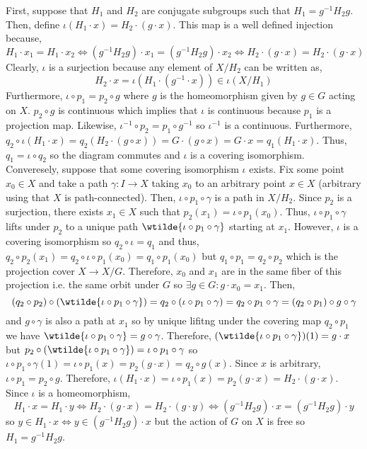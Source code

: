 \documentclass[12pt]{extarticle}
\begin{document}
\begin{enumerate}
First, suppose that $H_1$ and $H_2$ are conjugate subgroups such that $H_1 = g^{-1} H_2 g$. Then, define $\iota(H_1 \cdot x) = H_2 \cdot (g \cdot x)$. This map is a well defined injection because,
\[H_1 \cdot x_1 = H_1 \cdot x_2 \iff (g^{-1} H_2 g) \cdot x_1 = (g^{-1} H_2 g) \cdot x_2 \iff H_2 \cdot (g \cdot x) = H_2 \cdot (g \cdot x)\]
Clearly, $\iota$ is a surjection because any element of $X/H_2$ can be written as, 
\[H_2 \cdot x = \iota(H_1 \cdot (g^{-1} \cdot x)) \in \iota(X/H_1)\]
Furthermore, $\iota \circ p_1 = p_2 \circ g$ where $g$ is the homeomorphism given by $g \in G$ acting on $X$. $p_2 \circ g$ is continuous which implies that $\iota$ is continuous because $p_1$ is a projection map. Likewise, $\iota^{-1} \circ p_2 = p_1 \circ g^{-1}$ so $\iota^{-1}$ is a continuous. Furthermore, $q_2 \circ \iota(H_1 \cdot x) = q_2(H_2 \cdot (g \circ x)) = G \cdot (g \circ x) = G \cdot x = q_1(H_1 \cdot x)$. Thus, $q_1 = \iota \circ q_2$ so the diagram commutes and $\iota$ is a covering isomorphism. \bigskip \\
Converesely, suppose that some covering isomorphism $\iota$ exists. Fix some point $x_0 \in X$ and take a path $\gamma : I \to X$ taking $x_0$ to an arbitrary point $x \in X$ (arbitrary using that $X$ is path-connected). Then, $\iota \circ p_1 \circ \gamma$ is a path in $X/H_2$. Since $p_2$ is a surjection, there exists $x_1 \in X$ such that $p_2(x_1) = \iota \circ p_1(x_0)$. Thus, $\iota \circ p_1 \circ \gamma$ lifts under $p_2$ to a unique path $\wtilde{\iota \circ p_1 \circ \gamma}$ starting at $x_1$. However, $\iota$ is a covering isomorphism so $q_2 \circ \iota = q_1$ and thus, $q_2 \circ p_2(x_1) = q_2 \circ \iota \circ p_1(x_0) = q_1 \circ p_1(x_0)$ but $q_1 \circ p_1 = q_2 \circ p_2$ which is the projection cover $X \to X/G$. Therefore, $x_0$ and $x_1$ are in the same fiber of this projection i.e. the same orbit under $G$ so $\exists g \in G : g \cdot x_0 = x_1$. Then,
\[ (q_2 \circ p_2) \circ (\wtilde{\iota \circ p_1 \circ \gamma}) = q_2 \circ (\iota \circ p_1 \circ \gamma) = q_2 \circ p_1 \circ \gamma = (q_2 \circ p_1) \circ g \circ \gamma \]
and $g \circ \gamma$ is also a path at $x_1$ so by unique lifitng under the covering map $q_2 \circ p_1$ we have $\wtilde{\iota \circ p_1 \circ \gamma} = g \circ \gamma$. Therefore, $(\wtilde{\iota \circ p_1 \circ \gamma})(1) = g \cdot x$ but $p_2 \circ (\wtilde{\iota \circ p_1 \circ \gamma}) = \iota \circ p_1 \circ \gamma$ so $\iota \circ p_1 \circ \gamma(1) = \iota \circ p_1(x) = p_2(g \cdot x) = q_2 \circ g(x)$. Since $x$ is arbitrary, $\iota \circ p_1 = p_2 \circ g$. Therefore, $\iota(H_1 \cdot x) = \iota \circ p_1 (x) = p_2(g \cdot x) = H_2 \cdot (g \cdot x)$. Since $\iota$ is a homeomorphism, 
\[H_1 \cdot x = H_1 \cdot y \iff H_2 \cdot (g \cdot x) = H_2 \cdot (g \cdot y) \iff (g^{-1} H_2 g) \cdot x = (g^{-1} H_2 g) \cdot y\]
so $y \in H_1 \cdot x \iff y \in (g^{-1} H_2 g) \cdot x$ but the action of $G$ on $X$ is free so $H_1 = g^{-1} H_2 g$.


\end{enumerate}
\end{document}
